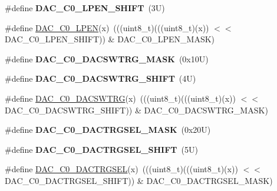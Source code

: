 \begin{DoxyCompactItemize}
\#define {\bfseries D\+A\+C\+\_\+\+C0\+\_\+\+L\+P\+E\+N\+\_\+\+S\+H\+I\+FT}~(3\+U)
\item 
\#define \mbox{\hyperlink{group___d_a_c___register___masks_gad377727f80a52490cc645e637df965e4}{D\+A\+C\+\_\+\+C0\+\_\+\+L\+P\+EN}}(x)~(((uint8\+\_\+t)(((uint8\+\_\+t)(x)) $<$$<$ D\+A\+C\+\_\+\+C0\+\_\+\+L\+P\+E\+N\+\_\+\+S\+H\+I\+FT)) \& D\+A\+C\+\_\+\+C0\+\_\+\+L\+P\+E\+N\+\_\+\+M\+A\+SK)
\item 
\mbox{\label{group___d_a_c___register___masks_ga7e785d90fec3c1817fc53fea41f41644}} 
\#define {\bfseries D\+A\+C\+\_\+\+C0\+\_\+\+D\+A\+C\+S\+W\+T\+R\+G\+\_\+\+M\+A\+SK}~(0x10\+U)
\item 
\mbox{\label{group___d_a_c___register___masks_ga25e2afd71ee5cc41adde6f072c9d2604}} 
\#define {\bfseries D\+A\+C\+\_\+\+C0\+\_\+\+D\+A\+C\+S\+W\+T\+R\+G\+\_\+\+S\+H\+I\+FT}~(4\+U)
\item 
\#define \mbox{\hyperlink{group___d_a_c___register___masks_ga775041bb7cbeca598c59975d064b39aa}{D\+A\+C\+\_\+\+C0\+\_\+\+D\+A\+C\+S\+W\+T\+RG}}(x)~(((uint8\+\_\+t)(((uint8\+\_\+t)(x)) $<$$<$ D\+A\+C\+\_\+\+C0\+\_\+\+D\+A\+C\+S\+W\+T\+R\+G\+\_\+\+S\+H\+I\+FT)) \& D\+A\+C\+\_\+\+C0\+\_\+\+D\+A\+C\+S\+W\+T\+R\+G\+\_\+\+M\+A\+SK)
\item 
\mbox{\label{group___d_a_c___register___masks_gac6dd81bc6500fc4b972c62bde339f31d}} 
\#define {\bfseries D\+A\+C\+\_\+\+C0\+\_\+\+D\+A\+C\+T\+R\+G\+S\+E\+L\+\_\+\+M\+A\+SK}~(0x20\+U)
\item 
\mbox{\label{group___d_a_c___register___masks_ga32f43711fa193364231213bd67c989f4}} 
\#define {\bfseries D\+A\+C\+\_\+\+C0\+\_\+\+D\+A\+C\+T\+R\+G\+S\+E\+L\+\_\+\+S\+H\+I\+FT}~(5\+U)
\item 
\#define \mbox{\hyperlink{group___d_a_c___register___masks_gab22f811620842eff6b7b673d5e8d52ea}{D\+A\+C\+\_\+\+C0\+\_\+\+D\+A\+C\+T\+R\+G\+S\+EL}}(x)~(((uint8\+\_\+t)(((uint8\+\_\+t)(x)) $<$$<$ D\+A\+C\+\_\+\+C0\+\_\+\+D\+A\+C\+T\+R\+G\+S\+E\+L\+\_\+\+S\+H\+I\+FT)) \& D\+A\+C\+\_\+\+C0\+\_\+\+D\+A\+C\+T\+R\+G\+S\+E\+L\+\_\+\+M\+A\+SK)
\item 
\mbox{\label{group___d_a_c___register___masks_gadc1973eafb50599b83de95422477a1f5}} 
$$
\end{DoxyCompactItemize}
